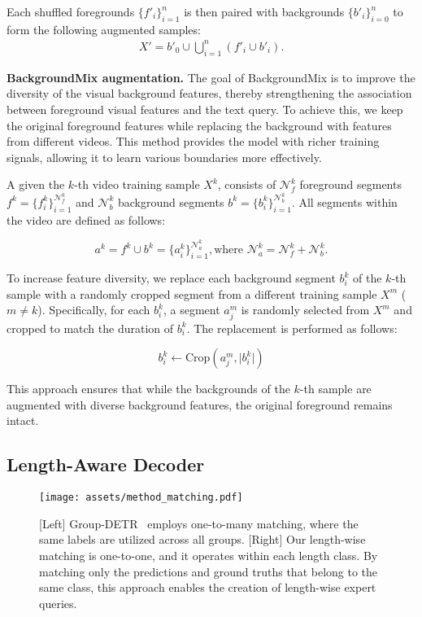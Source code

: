 Each shuffled foregrounds $\{f'_i\}_{i=1}^{n}$ is then paired with backgrounds $\{b'_i\}_{i=0}^{n}$ to form the following augmented samples:
\begin{equation}
\begin{gathered}
    X' = b'_0 \cup \bigcup_{i=1}^{n} (f'_i \cup b'_{i}).
\end{gathered}
\end{equation}

\noindent\textbf{BackgroundMix augmentation.} The goal of BackgroundMix is to improve the diversity of the visual background features, thereby strengthening the association between foreground visual features and the text query. To achieve this, we keep the original foreground features while replacing the background with features from different videos. This method provides the model with richer training signals, allowing it to learn various boundaries more effectively.

A given the \(k\)-th video training sample \( X^k \), consists of \(\mathcal{N}^k_f\) foreground segments \( f^k = \{f^k_i\}_{i=1}^{\mathcal{N}^k_f} \) and \(\mathcal{N}^k_b\) background segments \( b^k = \{b^k_i\}_{i=1}^{\mathcal{N}^k_b} \). All segments within the video are defined as follows:

\begin{equation}
a^k =  f^k \cup b^k = \{a^k_i\}_{i=1}^{\mathcal{N}^k_a},
\text{where } \mathcal{N}^k_a = \mathcal{N}^k_f + \mathcal{N}^k_b.
\end{equation}

To increase feature diversity, we replace each background segment \(b^k_i\) of the \(k\)-th sample with a randomly cropped segment from a different training sample \(X^m\) (\(m \neq k\)). Specifically, for each \(b^k_i\), a segment \(a^m_j\) is randomly selected from \(X^m\) and cropped to match the duration of \(b^k_i\). The replacement is performed as follows:

\[
b^k_i \leftarrow \text{Crop}(a^m_j, \lvert b^k_i \rvert)
\]

This approach ensures that while the backgrounds of the \(k\)-th sample are augmented with diverse background features, the original foreground remains intact.

\subsection{Length-Aware Decoder}
\label{subsec:Length_Aware_Decoder}

\begin{figure}[ht]
    \centering
    \texttt{[image: assets/method\_matching.pdf]}
    \caption{
    [Left] Group-DETR~\cite{chen2023group_Group_DETR} employs one-to-many matching, where the same labels are utilized across all groups.
    [Right] Our length-wise matching is one-to-one, and it operates within each length class.
    By matching only the predictions and ground truths that belong to the same class, this approach enables the creation of length-wise expert queries.
    }
    \label{fig:matching}
\end{figure}

